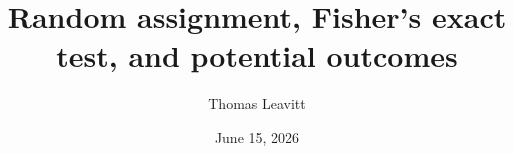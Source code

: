 \documentclass[table, xcolor = {dvipsnames}, 9pt]{beamer}
\title[]{Random assignment, Fisher's exact test, and potential outcomes} %
\author{Thomas Leavitt} %
\institute[]{} %
\date{June 15, 2026} %
\theoremstyle{plain}
\begin{document}
\begin{frame}
\titlepage %
\end{frame}


\end{document}
